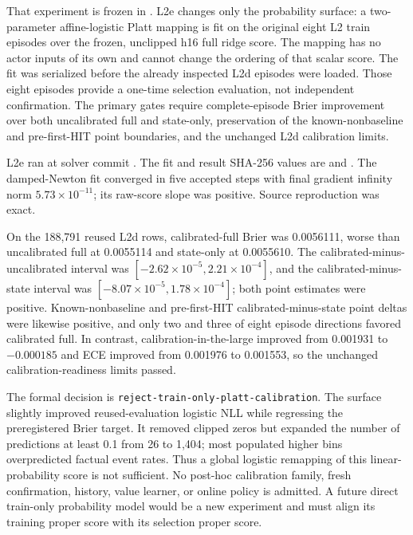 \documentclass[11pt]{article}
\begin{document}
That experiment is frozen in
.  L2e changes only the
probability surface: a two-parameter affine-logistic Platt mapping is fit on the
original eight L2 train episodes over the frozen, unclipped h16 full ridge
score.  The mapping has no actor inputs of its own and cannot change the
ordering of that scalar score.  The fit was serialized before the already
inspected L2d episodes were loaded.  Those eight episodes provide a one-time
selection evaluation, not independent confirmation.  The primary gates
require complete-episode Brier improvement over both uncalibrated full and
state-only, preservation of the known-nonbaseline and pre-first-HIT point
boundaries, and the unchanged L2d calibration limits.

L2e ran at solver commit
.  The fit and result SHA-256
values are
and
.
The damped-Newton fit converged in five accepted steps with final gradient
infinity norm $5.73\times10^{-11}$; its raw-score slope was positive.  Source
reproduction was exact.

On the 188,791 reused L2d rows, calibrated-full Brier was 0.0056111, worse
than uncalibrated full at 0.0055114 and state-only at 0.0055610.  The
calibrated-minus-uncalibrated interval was
$[-2.62\times10^{-5},2.21\times10^{-4}]$, and the calibrated-minus-state
interval was $[-8.07\times10^{-5},1.78\times10^{-4}]$; both point estimates
were positive.  Known-nonbaseline and pre-first-HIT calibrated-minus-state
point deltas were likewise positive, and only two and three of eight episode
directions favored calibrated full.  In contrast, calibration-in-the-large
improved from 0.001931 to $-0.000185$ and ECE improved from 0.001976 to
0.001553, so the unchanged calibration-readiness limits passed.

The formal decision is \texttt{reject-train-only-platt-calibration}.  The
surface slightly improved reused-evaluation logistic NLL while regressing the
preregistered Brier target.  It removed clipped zeros but expanded the number
of predictions at least 0.1 from 26 to 1,404; most populated higher bins
overpredicted factual event rates.  Thus a global logistic remapping of this
linear-probability score is not sufficient.  No post-hoc calibration family,
fresh confirmation, history, value learner, or online policy is admitted.  A
future direct train-only probability model would be a new experiment and must
align its training proper score with its selection proper score.
\end{document}
